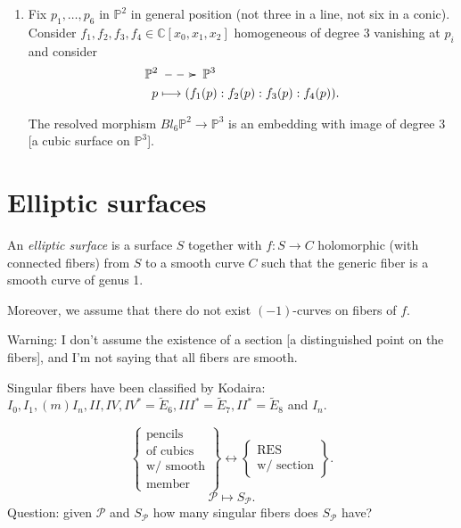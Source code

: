 \begin{enumerate}
\item Fix $p_1,…,p_6$ in  $\mathbb{P}^2$ in
general position
(not three in a line, not six in a conic).
Consider $f_1,f_2,f_3,f_4 \in
\mathbb{C}[x_0,x_1,x_2]$
homogeneous of degree $3$ vanishing at $p_i$
and consider
$$
\begin{aligned}
\mathbb{P}^2
&\xymatrix{\ar@{-->}[r]&}\mathbb{P}^3 \\
p &\longmapsto (f_1(p):f_2(p):f_3(p):f_4(p)).
\end{aligned}
$$

\noindent
The resolved morphism $Bl_6\mathbb{P}^2 \to
\mathbb{P}^3$
is an embedding with image of degree $3$
[a cubic surface on $\mathbb{P}^3$].
\end{enumerate}



\section{Elliptic surfaces}
\label{section-elliptic-surfaces}

\begin{definition}
\label{definition-elliptic-surface}
An {\it elliptic surface}
is a surface $S$ together with $f:S\to C$
holomorphic
(with connected fibers)
from $S$ to a smooth curve $C$
such that the generic fiber
is a smooth curve of genus 1.

Moreover, we assume that there
do not exist $(-1)$-curves on fibers of $f$.
\end{definition}

Warning: I don't assume the existence
of a section
[a distinguished point on the fibers],
and I'm not saying that
all fibers are smooth.

\medskip\noindent
Singular fibers have been classified by
Kodaira:
$I_0,I_1,(m)I_n,II, IV,IV^*=\tilde{E}_6,
III^*=\tilde{E}_7, II^*=\tilde{E}_8$ and
$I_n$.

\begin{example}
\label{example-pencils-of-cubics}
$$
\left\{\substack{\text{pencils} \\
\text{of cubics}\\
\text{w/ smooth}\\
\text{member}}\right\}
\leftrightarrow
\left\{\substack{\text{RES} \\ \text{w/
section}}\right\}.
$$
$$
\mathcal{P} \mapsto S_{\mathcal{P}}.
$$
 Question: given $\mathcal{P}$ and
 $S_{\mathcal{P}}$
how many singular fibers does
$S_{\mathcal{P}}$ have?
\end{example}

